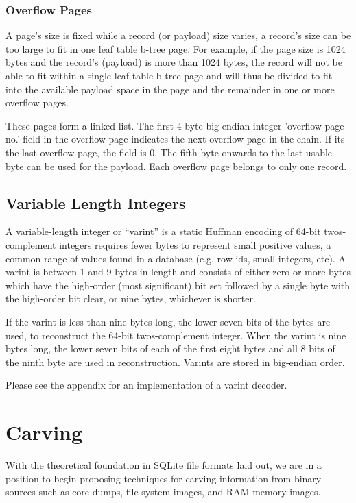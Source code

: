 \documentclass{article}
\begin{document}
\subsubsection{Overflow Pages}

A page's size is fixed while a record (or payload) size varies, a record's size can be too large to fit in one leaf table b-tree page. For example, if the page size is 1024 bytes and the record’s (payload) is more than 1024 bytes, the record will not be able to fit within a single leaf table b-tree page and will thus be divided to fit into the available payload space in the page and the remainder in one or more overflow pages. 

These pages form a linked list. The first 4-byte big endian integer 'overflow page no.' field in the overflow page indicates the next overflow page in the chain. If its the last overflow page, the field is 0. The fifth byte onwards to the last usable byte can be used for the payload. Each overflow page belongs to only one record.

\subsection{Variable Length Integers}

A variable-length integer or ``varint'' is a static Huffman encoding of 64-bit twos-complement integers requires fewer bytes to represent small positive values, a common range of values found in a database (e.g. row ids, small integers, etc). A varint is between 1 and 9 bytes in length and consists of either zero or more bytes which have the high-order (most significant) bit set followed by a single byte with the high-order bit clear, or nine bytes, whichever is shorter. 

If the varint is less than nine bytes long, the lower seven bits of the bytes are used, to reconstruct the 64-bit twos-complement integer. When the varint is nine bytes long, the lower seven bits of each of the first eight bytes and all 8 bits of the ninth byte are used in reconstruction. Varints are stored in big-endian order.

Please see the appendix for an implementation of a varint decoder.

\section{Carving}

With the theoretical foundation in SQLite file formats laid out, we are in a position to begin proposing techniques for carving information from binary sources such as core dumps, file system images, and RAM memory images.
\end{document}
